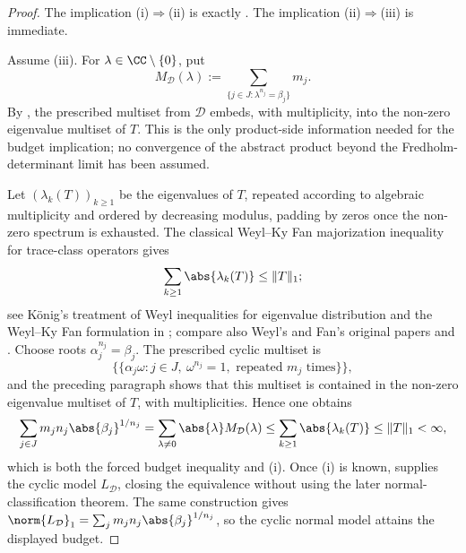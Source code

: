 \begin{proof}
  The implication \textup{(i)}\(\Rightarrow\)\textup{(ii)}
  is exactly .
  The implication \textup{(ii)}\(\Rightarrow\)\textup{(iii)} is immediate.

  Assume \textup{(iii)}. For \(\lambda\in\CC\setminus\{0\}\), put
  \[
    M_{\mathcal D}(\lambda)
    :=\sum_{\{j\in J:\lambda^{n_j}=\beta_j\}}m_j.
  \]
  By , the prescribed
  multiset from \(\mathcal D\) embeds, with
  multiplicity, into the non-zero eigenvalue multiset of \(T\). This is
  the only product-side information needed for the budget implication; no
  convergence of the abstract product beyond the Fredholm-determinant
  limit has been assumed.

  Let \((\lambda_k(T))_{k\ge1}\) be the eigenvalues of \(T\), repeated
  according to algebraic multiplicity and ordered by decreasing modulus,
  padding by zeros once the non-zero spectrum is exhausted. The classical
  Weyl--Ky Fan majorization inequality for trace-class operators gives
  \[
    \sum_{k\ge1}\abs{\lambda_k(T)}\le \|T\|_1;
  \]
  see K\"onig's treatment of Weyl inequalities for eigenvalue
  distribution \cite[Chapter~2, Section~2.a]{Konig1986EigenvalueDistribution}
  and the Weyl--Ky Fan formulation in
  \cite[Chapter~VI, Section~1]{GohbergGoldbergKaashoek1990ClassesI};
  compare also Weyl's and Fan's original papers
  \cite{Weyl1949EigenvalueInequalities,Fan1951MaximumProperties} and
  \cite[Chapter~1]{Simon2005TraceIdeals}. Choose roots
  \(\alpha_j^{n_j}=\beta_j\). The prescribed cyclic multiset is
  \[
    \bigl\{\!\bigl\{\alpha_j\omega:
      j\in J,\ \omega^{n_j}=1,\text{ repeated }m_j\text{ times}
    \bigr\}\!\bigr\},
  \]
  and the preceding paragraph shows that this multiset is contained in
  the non-zero eigenvalue multiset of \(T\), with multiplicities. Hence
  one obtains
  \[
    \sum_{j\in J}m_j n_j\abs{\beta_j}^{1/n_j}
    =\sum_{\lambda\neq 0}\abs{\lambda}M_{\mathcal D}(\lambda)
    \le \sum_{k\ge1}\abs{\lambda_k(T)}
    \le \|T\|_1<\infty,
  \]
  which is both the forced budget inequality and \textup{(i)}. Once
  \textup{(i)} is known,
   supplies the cyclic model
  \(L_{\mathcal D}\), closing the equivalence without using the later
  normal-classification theorem. The same construction gives
  \(\norm{L_{\mathcal D}}_1=
  \sum_jm_jn_j\abs{\beta_j}^{1/n_j}\), so the cyclic normal model attains
  the displayed budget.
\end{proof}

